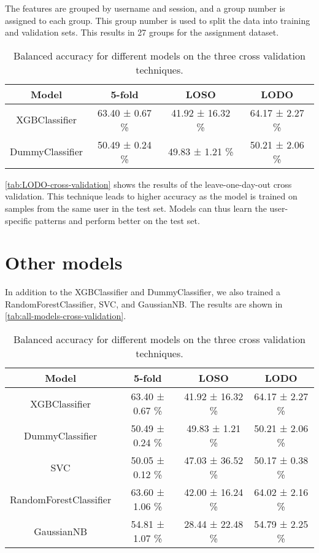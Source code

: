 \documentclass{usireport}
\begin{document}
The features are grouped by username and session, and a group number is assigned to each group. This group number is used to split the data into training and validation sets. This results in 27 groups for the assignment dataset.

\begin{table}[H]
    \centering
    \begin{tabular}{|c|c|c|c|}
        \hline
        \textbf{Model} & \textbf{5-fold} & \textbf{LOSO} & \textbf{LODO} \\
        \hline
        XGBClassifier & 63.40 ± 0.67 \% & 41.92 ± 16.32 \% & 64.17 ± 2.27 \% \\
        DummyClassifier & 50.49 ± 0.24 \% & 49.83 ± 1.21 \% & 50.21 ± 2.06 \% \\

        \hline
    \end{tabular}
    \caption{Balanced accuracy for different models on the three cross validation techniques.}
    \label{tab:LODO-cross-validation}
\end{table}

\autoref{tab:LODO-cross-validation} shows the results of the leave-one-day-out cross validation. This technique leads to higher accuracy as the model is trained on samples from the same user in the test set. Models can thus learn the user-specific patterns and perform better on the test set.

\section{Other models}

In addition to the XGBClassifier and DummyClassifier, we also trained a RandomForestClassifier, SVC, and GaussianNB. The results are shown in \autoref{tab:all-models-cross-validation}.

\begin{table}[H]
    \centering
    \begin{tabular}{|c|c|c|c|}
        \hline
        \textbf{Model} & \textbf{5-fold} & \textbf{LOSO} & \textbf{LODO} \\
        \hline
        XGBClassifier & 63.40 ± 0.67 \% & 41.92 ± 16.32 \% & 64.17 ± 2.27 \% \\
        DummyClassifier & 50.49 ± 0.24 \% & 49.83 ± 1.21 \% & 50.21 ± 2.06 \% \\
        SVC & 50.05 ± 0.12 \% & 47.03 ± 36.52 \% & 50.17 ± 0.38 \% \\
        RandomForestClassifier & 63.60 ± 1.06 \% & 42.00 ± 16.24 \% & 64.02 ± 2.16 \% \\
        GaussianNB & 54.81 ± 1.07 \% & 28.44 ± 22.48 \% & 54.79 ± 2.25 \% \\
        \hline
    \end{tabular}
    \caption{Balanced accuracy for different models on the three cross validation techniques.}
    \label{tab:all-models-cross-validation}
\end{table}
\end{document}
